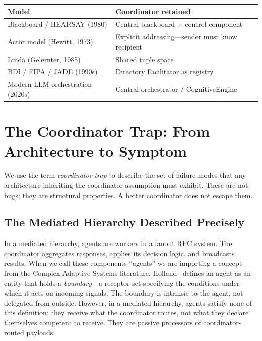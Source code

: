 \documentclass[11pt]{article}
\begin{document}
\begin{center}
\begin{tabular}{ll}
\toprule
\textbf{Model} & \textbf{Coordinator retained} \\
\midrule
Blackboard / HEARSAY (1980) & Central blackboard + control component \\
Actor model (Hewitt, 1973) & Explicit addressing---sender must know recipient \\
Linda (Gelernter, 1985) & Shared tuple space \\
BDI / FIPA / JADE (1990s) & Directory Facilitator as registry \\
Modern LLM orchestration (2020s) & Central orchestrator / CognitiveEngine \\
\bottomrule
\end{tabular}
\end{center}

\section{The Coordinator Trap: From Architecture to Symptom}
\label{sec:trap}

We use the term \emph{coordinator trap} to describe the set of failure modes that
any architecture inheriting the coordinator assumption must exhibit. These are not
bugs; they are structural properties. A better coordinator does not escape them.

\subsection{The Mediated Hierarchy Described Precisely}

In a mediated hierarchy, agents are workers in a fanout RPC system. The
coordinator aggregates responses, applies its decision logic, and broadcasts
results. When we call these components ``agents'' we are importing a concept from
the Complex Adaptive Systems literature. Holland~\cite{holland} defines an agent
as an entity that holds a \emph{boundary}---a receptor set specifying the
conditions under which it acts on incoming signals. The boundary is intrinsic to
the agent, not delegated from outside. However, in a mediated hierarchy, agents satisfy
none of this definition: they receive what the coordinator routes, not what they
declare themselves competent to receive. They are passive processors of
coordinator-routed payloads.
\end{document}

